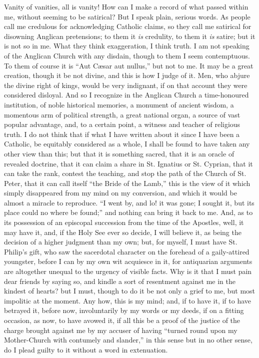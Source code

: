 Vanity of vanities, all is
vanity! How can I make a record of what passed within me, without
seeming to be satirical? But I speak plain, serious words. As people
call me credulous for acknowledging Catholic claims, so they call me
satirical for disowning Anglican pretensions; to them it \emph{is}
credulity, to them it \emph{is} satire; but it is not so in me. What
they think exaggeration, I think truth. I am not speaking of the
Anglican Church with any
disdain, though to them I seem contemptuous. To them of course it is
``Aut Cæsar aut nullus,'' but not to me. It may be a great
creation, though it be not divine, and this is how I judge of it. Men,
who abjure the divine right of kings, would be very indignant, if on
that account they were considered disloyal. And so I recognize in the
Anglican Church a time-honoured institution, of noble historical
memories, a monument of ancient wisdom, a momentous arm of political
strength, a great national organ, a source of vast popular advantage,
and, to a certain point, a witness and teacher of religious truth. I do
not think that if what I have written about it since I have been a
Catholic, be equitably considered as a whole, I shall be found to
have taken any other view than this; but that it is something sacred,
that it is an oracle of revealed doctrine, that it can claim a share in
St. Ignatius or St. Cyprian, that it can take the rank, contest the
teaching, and stop the path of the Church of St. Peter, that it can call
itself ``the Bride of the Lamb,'' this is the view of it which
simply disappeared from my mind on my conversion, and which it would be
almost a miracle to reproduce. ``I went by, and lo! it was gone; I
sought it, but its place could no where be found;'' and nothing can
bring it back to me. And, as to its possession of an episcopal
succession from the time of the Apostles, well, it may have it, and, if
the Holy See ever so decide, I will believe it, as being the decision
of a higher judgment than my own; but, for myself, I must have St.
Philip's gift, who saw the sacerdotal character on the forehead of a
gaily-attired youngster, before I can by my own wit acquiesce in it, for
antiquarian arguments are altogether unequal to the urgency of visible
facts. Why is it that I must pain dear friends by saying so, and kindle
a sort of resentment against me in the kindest of hearts? but I must,
though to do it be not only a grief to me, but most impolitic at the
moment. Any how, this is my mind; and, if to have it, if to have
betrayed it, before now, involuntarily by my words or my deeds, if on a
fitting occasion, as now, to have avowed it, if all this be a proof of
the justice of the charge brought against me by my accuser of
having ``turned round upon my Mother-Church with contumely and
slander,'' in this sense but in no other sense, do I plead guilty
to it without a word in extenuation.

